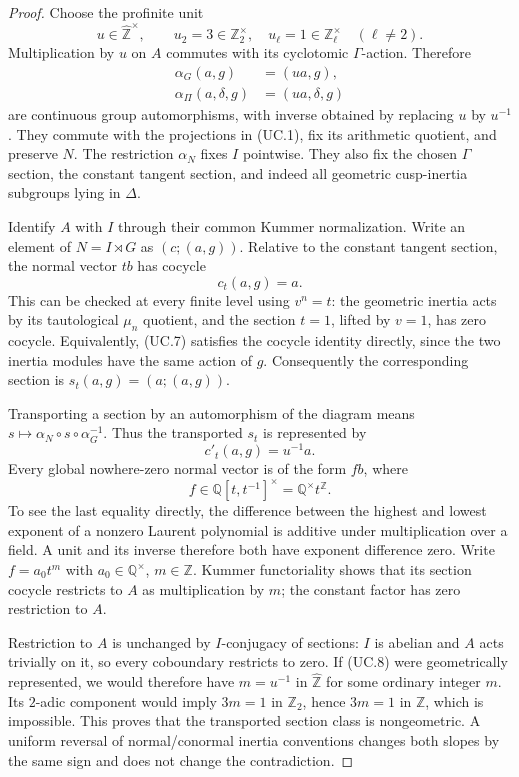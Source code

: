 \begin{proof}
Choose the profinite unit
\[
 u\in\widehat{\mathbb Z}^{\times},\qquad
 u_2=3\in\mathbb Z_2^\times,\quad
 u_\ell=1\in\mathbb Z_\ell^\times\quad(\ell\ne2).           \tag{UC.5}
\]
Multiplication by $u$ on $A$ commutes with its cyclotomic
$\Gamma$-action. Therefore
\[
 \begin{split}
 \alpha_G(a,g)&=(ua,g),\\
 \alpha_\Pi(a,\delta,g)&=(ua,\delta,g)
 \end{split}                                               \tag{UC.6}
\]
are continuous group automorphisms, with inverse obtained by
replacing $u$ by $u^{-1}$. They commute with the projections in
(UC.1), fix its arithmetic quotient, and preserve $N$.
The restriction $\alpha_N$ fixes $I$ pointwise. They also fix
the chosen $\Gamma$ section, the constant tangent section, and
indeed all geometric cusp-inertia subgroups lying in $\Delta$.

Identify $A$ with $I$ through their common Kummer normalization.
Write an element of $N=I\rtimes G$ as $(c;(a,g))$.
Relative to the constant tangent section, the normal vector
$t b$ has cocycle
\[
 c_t(a,g)=a.                                               \tag{UC.7}
\]
This can be checked at every finite level using $v^n=t$:
the geometric inertia acts by its tautological $\mu_n$ quotient,
and the section $t=1$, lifted by $v=1$, has zero cocycle.
Equivalently, (UC.7) satisfies the cocycle identity directly,
since the two inertia modules have the same action of $g$.
Consequently the corresponding section is
$s_t(a,g)=(a;(a,g))$.

Transporting a section by an automorphism of the diagram means
$s\mapsto\alpha_N\circ s\circ\alpha_G^{-1}$. Thus the
transported $s_t$ is represented by
\[
 c'_t(a,g)=u^{-1}a.                                       \tag{UC.8}
\]
Every global nowhere-zero normal vector is of the form
$f b$, where
\[
 f\in\mathbb Q[t,t^{-1}]^\times=\mathbb Q^\times t^{\mathbb Z}.
                                                               \tag{UC.9}
\]
To see the last equality directly, the difference between the
highest and lowest exponent of a nonzero Laurent polynomial
is additive under multiplication over a field. A unit and its
inverse therefore both have exponent difference zero.
Write $f=a_0t^m$ with $a_0\in\mathbb Q^\times$, $m\in\mathbb Z$.
Kummer functoriality shows that its section cocycle restricts
to $A$ as multiplication by $m$; the constant factor has
zero restriction to $A$.

Restriction to $A$ is unchanged by $I$-conjugacy of sections:
$I$ is abelian and $A$ acts trivially on it, so every coboundary
restricts to zero. If (UC.8) were geometrically represented,
we would therefore have $m=u^{-1}$ in
$\widehat{\mathbb Z}$ for some ordinary integer $m$.
Its $2$-adic component would imply $3m=1$ in $\mathbb Z_2$,
hence $3m=1$ in $\mathbb Z$, which is impossible.
This proves that the transported section class is nongeometric.
A uniform reversal of normal/conormal inertia conventions changes
both slopes by the same sign and does not change the contradiction.
\end{proof}

